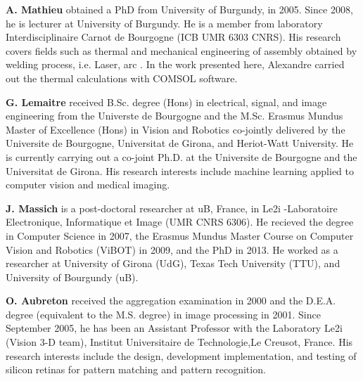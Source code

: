\documentclass[12pt]{spieman}
\begin{document}
\begin{spacing}{2}
\vspace{2ex}\noindent\textbf{A. Mathieu} obtained a PhD from University of Burgundy, in 2005. Since 2008, he is lecturer at University of Burgundy. He is a member from laboratory Interdisciplinaire Carnot de Bourgogne (ICB UMR 6303 CNRS). His research covers fields such as thermal and mechanical engineering of assembly obtained by welding process, i.e. Laser, arc . In the work presented here, Alexandre carried out the thermal calculations with COMSOL software. 

\vspace{2ex}\noindent\textbf{G. Lemaitre} received B.Sc. degree (Hons) in electrical, signal, and image engineering from the Universte de Bourgogne and the M.Sc. Erasmus Mundus Master of Excellence (Hons) in Vision and Robotics co-jointly delivered by the Universite de Bourgogne, Universitat de Girona, and Heriot-Watt University. 
He is currently carrying out a co-joint Ph.D. at the Universite de Bourgogne and the Universitat de Girona. His research interests include machine learning applied to computer vision and medical imaging.

\vspace{2ex}\noindent\textbf{J. Massich}  is a post-doctoral researcher at uB, France, in Le2i -Laboratoire Electronique, Informatique et Image (UMR CNRS 6306).
He recieved the degree in Computer Science in 2007, the Erasmus Mundus Master Course on Computer Vision and Robotics (ViBOT) in 2009, and the PhD in 2013.
He worked as a researcher at University of Girona (UdG), Texas Tech University (TTU), and University of Bourgundy (uB).

\vspace{2ex}\noindent\textbf{O. Aubreton} received the aggregation examination in 2000 and the D.E.A. degree (equivalent to the M.S. degree) in image processing in 2001.
Since September 2005, he has been an Assistant Professor with the Laboratory Le2i (Vision
3-D team), Institut Universitaire de Technologie,Le Creusot, France. His research interests include the design, development implementation, and testing of silicon retinas for pattern matching and pattern recognition.



\newpage
\listoffigures

\newpage
\listoftables

\newpage   

\newpage   


\end{spacing}
\end{document}
